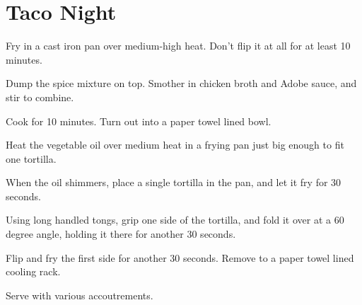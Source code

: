 
\section{Taco Night}
\begin{recipe}



Fry in a cast iron pan over medium-high heat. Don't flip it at all for at least 10 minutes.


Dump the spice mixture on top. Smother in chicken broth and Adobe sauce, and stir to combine.

Cook for 10 minutes. Turn out into a paper towel lined bowl.


Heat the vegetable oil over medium heat in a frying pan just big enough to fit one tortilla.

When the oil shimmers, place a single tortilla in the pan, and let it fry for 30 seconds.

Using long handled tongs, grip one side of the tortilla, and fold it over at a 60 degree angle, holding it there for another 30 seconds.

Flip and fry the first side for another 30 seconds. Remove to a paper towel lined cooling rack.


Serve with various accoutrements.


\end{recipe}
